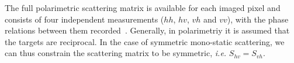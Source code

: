 The full polarimetric scattering matrix is available for each imaged pixel and consists of four independent measurements ($hh$, $hv$, $vh$ and $vv$), with the phase relations between them recorded~\cite{tragl1990polarimetric}. Generally, in polarimetriy it is assumed that the targets are reciprocal. In the case of symmetric mono-static scattering, we can thus constrain the scattering matrix to be symmetric, \emph{i.e.} $S_{hv} = S_{vh}$. %


 





